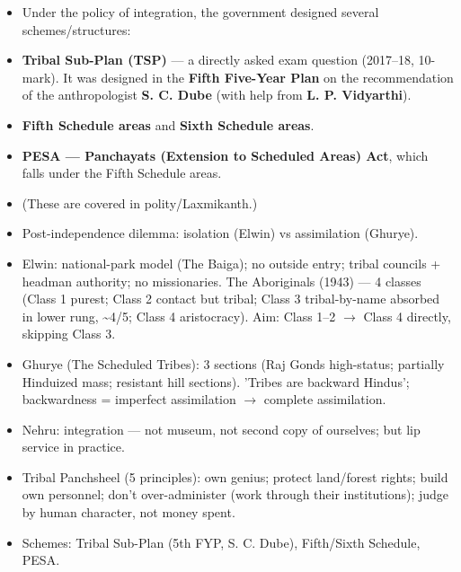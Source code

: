 \begin{GovtPolicy}
\begin{itemize}
\item Under the policy of integration, the government designed several schemes/structures:
\item \textbf{Tribal Sub-Plan (TSP)} --- a directly asked exam question (2017--18, 10-mark). It was designed in the \textbf{Fifth Five-Year Plan} on the recommendation of the anthropologist \textbf{S. C. Dube} (with help from \textbf{L. P. Vidyarthi}).
\item \textbf{Fifth Schedule areas} and \textbf{Sixth Schedule areas}.
\item \textbf{PESA --- Panchayats (Extension to Scheduled Areas) Act}, which falls under the Fifth Schedule areas.
\item (These are covered in polity/Laxmikanth.)
\end{itemize}
\end{GovtPolicy}

\begin{QuickRevision}
\begin{itemize}
\item Post-independence dilemma: isolation (Elwin) vs assimilation (Ghurye).
\item Elwin: national-park model (The Baiga); no outside entry; tribal councils + headman authority; no missionaries. The Aboriginals (1943) --- 4 classes (Class 1 purest; Class 2 contact but tribal; Class 3 tribal-by-name absorbed in lower rung, \textasciitilde{}4/5; Class 4 aristocracy). Aim: Class 1--2 $\rightarrow$ Class 4 directly, skipping Class 3.
\item Ghurye (The Scheduled Tribes): 3 sections (Raj Gonds high-status; partially Hinduized mass; resistant hill sections). 'Tribes are backward Hindus'; backwardness = imperfect assimilation $\rightarrow$ complete assimilation.
\item Nehru: integration --- not museum, not second copy of ourselves; but lip service in practice.
\item Tribal Panchsheel (5 principles): own genius; protect land/forest rights; build own personnel; don't over-administer (work through their institutions); judge by human character, not money spent.
\item Schemes: Tribal Sub-Plan (5th FYP, S. C. Dube), Fifth/Sixth Schedule, PESA.
\end{itemize}
\end{QuickRevision}

